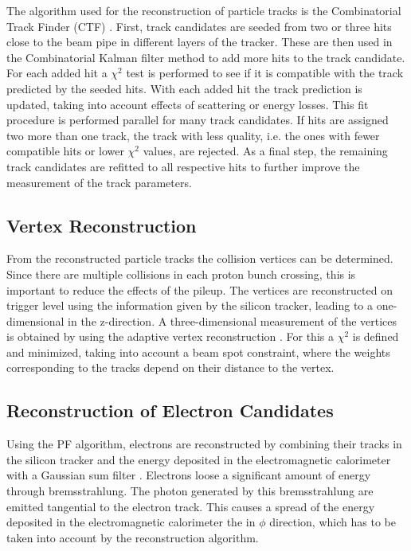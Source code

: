 \noindent The algorithm used for the reconstruction of particle tracks is the Combinatorial Track Finder (CTF) \cite{ctf1,ctf2}. First, track candidates are seeded from two or three hits close to the beam pipe in different layers of the tracker. These are then used in the Combinatorial Kalman filter method \cite{kalman} to add more hits to the track candidate. For each added hit a $\chi^2$ test is performed to see if it is compatible with the track predicted by the seeded hits. With each added hit the track prediction is updated, taking into account effects of scattering or energy losses. This fit procedure is performed parallel for many track candidates. If hits are assigned two more than one track, the track with less quality, i.e. the ones with fewer compatible hits or lower $\chi^2$ values, are rejected. As a final step, the remaining track candidates are refitted to all respective hits to further improve the measurement of the track parameters.

\subsection{Vertex Reconstruction}
From the reconstructed particle tracks the collision vertices can be determined. Since there are multiple collisions in each proton bunch crossing, this is important to reduce the effects of the pileup. The vertices are reconstructed on trigger level using the information given by the silicon tracker, leading to a one-dimensional in the z-direction. A three-dimensional measurement of the vertices is obtained by using the adaptive vertex reconstruction \cite{vertexreco}. For this a $\chi^2$ is defined and minimized, taking into account a beam spot constraint, where the weights corresponding to the tracks depend on their distance to the vertex.
\subsection{Reconstruction of Electron Candidates}
Using the PF algorithm, electrons are reconstructed by combining their tracks in the silicon tracker and the energy deposited in the electromagnetic calorimeter with a Gaussian sum filter \cite{elreco1,elreco2}. Electrons loose a significant amount of energy through bremsstrahlung. The photon generated by this bremsstrahlung are emitted tangential to the electron track. This causes a spread of the energy deposited in the electromagnetic calorimeter the in $\phi$ direction, which has to be taken into account by the reconstruction algorithm.\\

